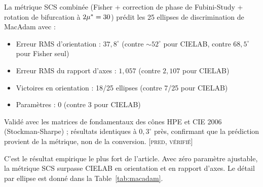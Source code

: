 \documentclass[12pt,a4paper]{article}
\begin{document}
\begin{predictionbox}
La m\'etrique SCS combin\'ee (Fisher + correction de phase de
Fubini-Study + rotation de bifurcation \`a $2{\mu^{*}} = 30$) pr\'edit les
25 ellipses de discrimination de MacAdam avec :
\begin{itemize}[nosep]
\item Erreur RMS d'orientation : $37{,}8^\circ$ (contre $\sim\!52^\circ$
  pour CIELAB, contre $68{,}5^\circ$ pour Fisher seul)
\item Erreur RMS du rapport d'axes : $1{,}057$ (contre $2{,}107$
  pour CIELAB)
\item Victoires en orientation : 18/25 ellipses (contre 7/25 pour CIELAB)
\item Param\`etres : 0 (contre 3 pour CIELAB)
\end{itemize}
Valid\'e avec les matrices de fondamentaux des c\^ones HPE et CIE 2006
(Stockman-Sharpe) ; r\'esultats identiques \`a $0{,}3^\circ$ pr\`es,
confirmant que la pr\'ediction provient de la m\'etrique, non de la
conversion. \textsc{[pred, v\'erifi\'e]}
\end{predictionbox}

C'est le r\'esultat empirique le plus fort de l'article. Avec z\'ero
param\`etre ajustable, la m\'etrique SCS surpasse CIELAB en orientation
et en rapport d'axes. Le d\'etail par ellipse est donn\'e dans la
Table~\ref{tab:macadam}.
\end{document}
